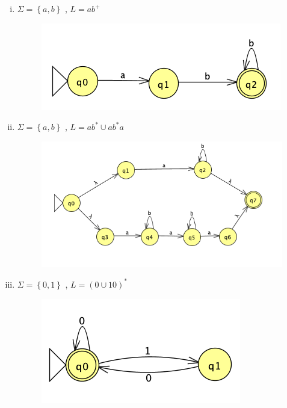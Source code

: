 \documentclass[
	12pt, %
]{fphw}
\begin{document}
\begin{enumerate}
\begin{enumerate}[(i)]
\begin{figure}[H]
    \end{figure}
    \newpage
  \item $\Sigma = \left\lbrace a,b \right\rbrace$ , $L= ab^{+}$ \\
    \begin{figure}[H]
      \centering
      \includegraphics{images/problema_3.png}
    \end{figure}
  \item $\Sigma = \left\lbrace a,b \right\rbrace$ , $L= ab^{*} \cup ab^{*}a$ \\
    \begin{figure}[H]
      \centering
      \includegraphics{images/problema_4.png}
    \end{figure}
    \newpage
  \item $\Sigma = \left\lbrace 0,1 \right\rbrace$ , $L= \left(0 \cup 10\right)^{*} $ \\
    \begin{figure}[H]
      \centering
      \includegraphics{images/problema_5.png}
    \end{figure}

\end{enumerate}
\end{enumerate}
\end{document}
